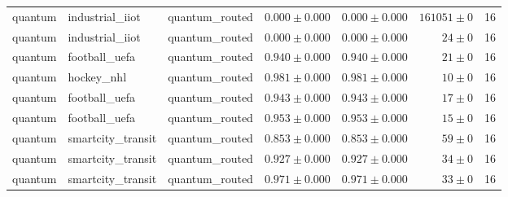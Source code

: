\begin{table}[htbp]
\begin{tabular}{l l l r r r r}
quantum & industrial\_iiot & quantum\_routed & $0.000\pm0.000$ & $0.000\pm0.000$ & $161051\pm0$ & 16 \\
quantum & industrial\_iiot & quantum\_routed & $0.000\pm0.000$ & $0.000\pm0.000$ & $24\pm0$ & 16 \\
quantum & football\_uefa & quantum\_routed & $0.940\pm0.000$ & $0.940\pm0.000$ & $21\pm0$ & 16 \\
quantum & hockey\_nhl & quantum\_routed & $0.981\pm0.000$ & $0.981\pm0.000$ & $10\pm0$ & 16 \\
quantum & football\_uefa & quantum\_routed & $0.943\pm0.000$ & $0.943\pm0.000$ & $17\pm0$ & 16 \\
quantum & football\_uefa & quantum\_routed & $0.953\pm0.000$ & $0.953\pm0.000$ & $15\pm0$ & 16 \\
quantum & smartcity\_transit & quantum\_routed & $0.853\pm0.000$ & $0.853\pm0.000$ & $59\pm0$ & 16 \\
quantum & smartcity\_transit & quantum\_routed & $0.927\pm0.000$ & $0.927\pm0.000$ & $34\pm0$ & 16 \\
quantum & smartcity\_transit & quantum\_routed & $0.971\pm0.000$ & $0.971\pm0.000$ & $33\pm0$ & 16 \\
\hline
\end{tabular}
\end{table}
